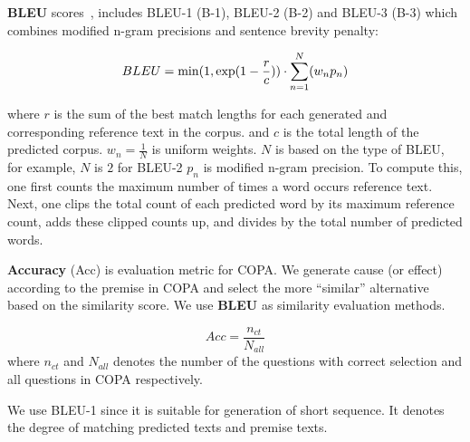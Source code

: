 \textbf{BLEU} scores~\cite{PapineniRWZ02}, 
includes BLEU-1 (B-1), BLEU-2 (B-2) and BLEU-3 (B-3)
which combines modified n-gram precisions and sentence brevity penalty:

\begin{equation}
\small BLEU = \min(1,\exp(1-\frac{r}{c})) \cdot \sum_{n=1}^{N}(w_{n}p_{n})
\end{equation}

where $r$ is the sum of the best match lengths 
for each generated and corresponding reference text in the corpus.
and $c$ is the total length of the predicted corpus. 
$w_n=\frac{1}{N}$ is uniform weights. $N$ is based on the type of BLEU, 
for example, $N$ is $2$ for BLEU-2
$p_n$ is modified n-gram precision. To compute this, 
one first counts the maximum number of times a word occurs reference text. 
Next, one clips the total count of each predicted word by its maximum
reference count, adds these clipped counts up, and
divides by the total number of predicted words. 

%

\textbf{Accuracy} (Acc) is evaluation metric for COPA.
We generate cause (or effect) according to the premise in COPA
and select the more ``similar'' alternative based on the similarity
score. We use \textbf{BLEU} as similarity evaluation methods.

\begin{equation}
Acc = \frac{n_{ct}}{N_{all}}
\end{equation}
where $n_{ct}$ and $N_{all}$ denotes
the number of the questions with correct selection
and all questions in COPA respectively.

We use BLEU-1 since it is suitable for generation
of short sequence. It denotes the degree of matching 
predicted texts and premise texts. 

